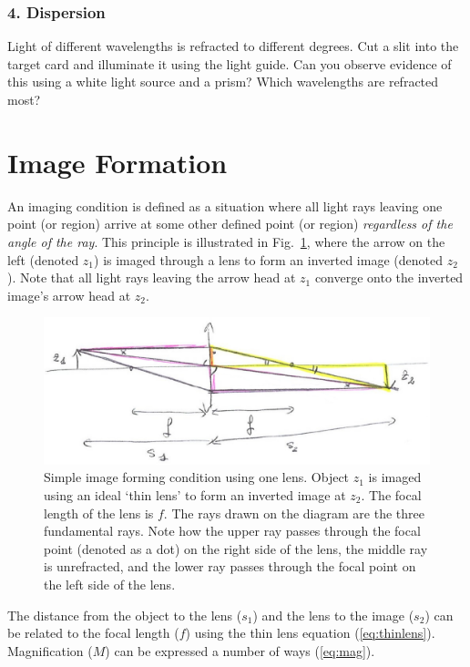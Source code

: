\documentclass[a4paper]{report}
\begin{document}
\subsubsection{4. Dispersion}
Light of different wavelengths is refracted to different degrees. Cut
a slit into the target card and illuminate it using the light guide. Can
you observe evidence of this using a white light source and a prism?
Which wavelengths are refracted most? 


\clearpage
\section{Image Formation}
An imaging condition is defined as a situation where all light rays
leaving one point (or region) arrive at some other defined point (or
region) \textit{regardless of the angle of the ray}. This principle is
illustrated in Fig.~\ref{onelens}, where the arrow on the left
(denoted $z_1$) is imaged through a lens to form an inverted image
(denoted $z_2$). Note that all light rays leaving the arrow head at
$z_1$ converge onto the inverted image's arrow head at $z_2$. 


\begin{figure}[h]
\center
\includegraphics[width=5in]{oneLens.eps}
\caption{Simple image forming condition using one lens. Object $z_1$
  is imaged using an ideal `thin lens' to form an inverted image at
  $z_2$. The focal length of the lens is $f$. The rays drawn on the
  diagram are the three fundamental rays. Note how the upper ray
  passes through the focal point (denoted as a dot) on the right side
  of the lens, the middle ray is unrefracted, and the lower ray passes
  through the focal point on the left side of the lens. }
\label{onelens}
\end{figure}


The distance from the object to the lens ($s_1$) and the lens to the
image ($s_2$) can be related to the focal length ($f$) using the thin
lens equation (\ref{eq:thinlens}). Magnification ($M$) can be
expressed a number of ways (\ref{eq:mag}).
\end{document}
